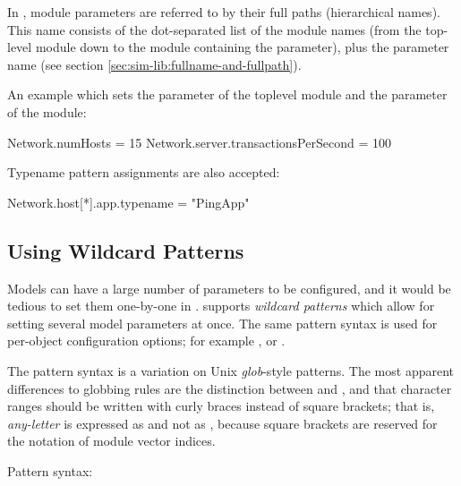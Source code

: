 In , module parameters are referred to by their full paths
(hierarchical names). This name consists of the dot-separated list of
the module names (from the top-level module down to the module containing
the parameter), plus the parameter name
(see section \ref{sec:sim-lib:fullname-and-fullpath}).

An example  which sets the  parameter of
the toplevel module and the  parameter of the
 module:

\begin{inifile}
[General]
Network.numHosts = 15
Network.server.transactionsPerSecond = 100
\end{inifile}

Typename pattern assignments are also accepted:

\begin{inifile}
[General]
Network.host[*].app.typename = "PingApp"
\end{inifile}


\subsection{Using Wildcard Patterns}
\label{sec:ch-config-sim:wildcards}

Models can have a large number of parameters to be configured, and it would
be tedious to set them one-by-one in . {\opp} supports
\textit{wildcard patterns} which allow for setting several model parameters
at once. The same pattern syntax is used for per-object configuration options;
for example , or .

The pattern syntax is a variation on Unix \textit{glob}-style
patterns. The most apparent differences to globbing rules are the
distinction between \ttt{*} and \ttt{**}, and that character ranges should
be written with curly braces instead of square brackets; that is,
\textit{any-letter} is expressed as  and not as
\ttt{[a-zA-Z]}, because square brackets are reserved for the notation of
module vector indices.

Pattern syntax:

